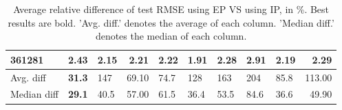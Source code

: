 \begin{table}[ht!]
\begin{tabular}{lllrlllllr}
  361281 & 2.43 & 2.15 & 2.21 & 2.22 & \textbf{1.91} & 2.28 & 2.91 & 2.19 & 2.29 \\ 
   \hline
Avg. diff & \textbf{31.3} & 147 & 69.10 & 74.7 & 128 & 163 & 204 & 85.8 & 113.00 \\ 
  Median diff & \textbf{29.1} & 40.5 & 57.00 & 61.5 & 36.4 & 53.5 & 84.6 & 36.6 & 49.90 \\ 
   \hline
\hline
\end{tabular}
\endgroup
\caption{Average relative difference of test RMSE using EP VS using IP, in \%. 
                  Best results are bold. 
                  'Avg. diff.' denotes the average of each column.
                  'Median diff.' denotes the median of each column.} 
\label{TABLES/table_results_RMSE_clustering_only_num_features_EP_VS_IP}
\end{table}
